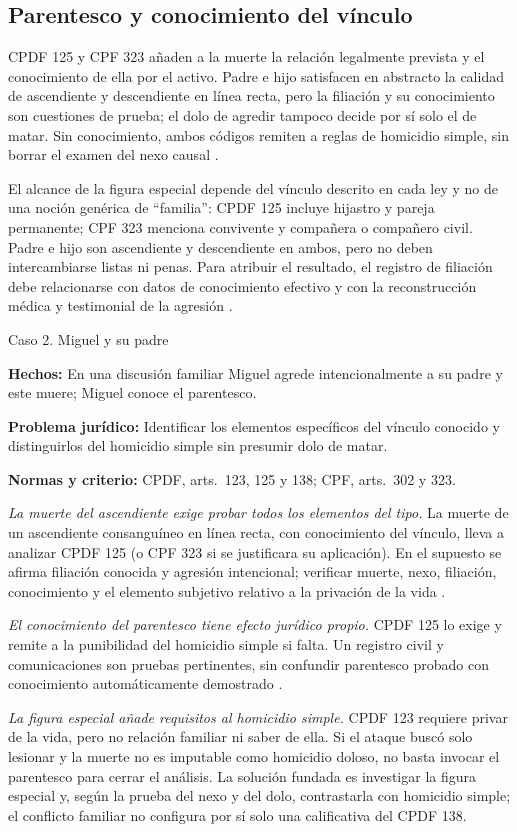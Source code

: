 \documentclass[spanish,letterpaper,oneside]{article}
\newcommand{\fichacaso}[3]{%
	\begin{tcolorbox}[colback=casoverde!5,colframe=casoverde!30,
		boxrule=0.4pt,arc=0.6mm,left=2mm,right=2mm,top=1mm,bottom=1mm]
	\textbf{Hechos:} #1\par
	\textbf{Problema jurídico:} #2\par
	\textbf{Normas y criterio:} #3
	\end{tcolorbox}%
}
\begin{document}
\subsection*{Parentesco y conocimiento del vínculo}
CPDF 125 y CPF 323 añaden a la muerte la relación legalmente prevista y el conocimiento de ella por el activo. Padre e hijo satisfacen en abstracto la calidad de ascendiente y descendiente en línea recta, pero la filiación y su conocimiento son cuestiones de prueba; el dolo de agredir tampoco decide por sí solo el de matar. Sin conocimiento, ambos códigos remiten a reglas de homicidio simple, sin borrar el examen del nexo causal \citep{cpdfS3Consolidado,cpfOficial2026}.

El alcance de la figura especial depende del vínculo descrito en cada ley y no de una noción genérica de ``familia'': CPDF 125 incluye hijastro y pareja permanente; CPF 323 menciona convivente y compañera o compañero civil. Padre e hijo son ascendiente y descendiente en ambos, pero no deben intercambiarse listas ni penas. Para atribuir el resultado, el registro de filiación debe relacionarse con datos de conocimiento efectivo y con la reconstrucción médica y testimonial de la agresión \citep[art.~125]{cpdfS3Consolidado}\citep[art.~323]{cpfOficial2026}.

\begin{casoestudio}{Caso 2. Miguel y su padre}
\fichacaso{En una discusión familiar Miguel agrede intencionalmente a su padre y este muere; Miguel conoce el parentesco.}{Identificar los elementos específicos del vínculo conocido y distinguirlos del homicidio simple sin presumir dolo de matar.}{CPDF, arts.~123, 125 y 138; CPF, arts.~302 y 323.}
\textit{La muerte del ascendiente exige probar todos los elementos del tipo.} La muerte de un ascendiente consanguíneo en línea recta, con conocimiento del vínculo, lleva a analizar CPDF 125 (o CPF 323 si se justificara su aplicación). En el supuesto se afirma filiación conocida y agresión intencional; verificar muerte, nexo, filiación, conocimiento y el elemento subjetivo relativo a la privación de la vida \citep{cpdfS3Consolidado,cpfOficial2026}.

\textit{El conocimiento del parentesco tiene efecto jurídico propio.} CPDF 125 lo exige y remite a la punibilidad del homicidio simple si falta. Un registro civil y comunicaciones son pruebas pertinentes, sin confundir parentesco probado con conocimiento automáticamente demostrado \citep[art.~125]{cpdfS3Consolidado}.

\textit{La figura especial añade requisitos al homicidio simple.} CPDF 123 requiere privar de la vida, pero no relación familiar ni saber de ella. Si el ataque buscó solo lesionar y la muerte no es imputable como homicidio doloso, no basta invocar el parentesco para cerrar el análisis. La solución fundada es investigar la figura especial y, según la prueba del nexo y del dolo, contrastarla con homicidio simple; el conflicto familiar no configura por sí solo una calificativa del CPDF 138.
\end{casoestudio}
\end{document}
